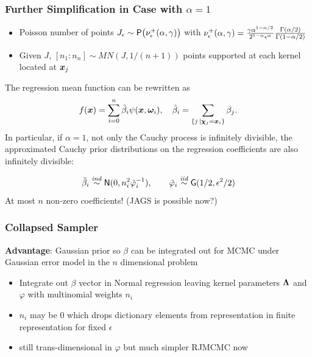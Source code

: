 \documentclass[handout]{beamer}
\newcommand{\bs}[2]{\begin{frame} \frametitle{#1}
{#2}
\end{frame} }
\begin{document}
\bs{Further Simplification in Case with $\alpha = 1$} {
  \begin{itemize}
  \item Poisson number of points $J_\epsilon\sim \mbox{\sf P}\big(
    \nu_\epsilon^+(\alpha, \gamma) \big)$ with $\nu_\epsilon^+(\alpha, \gamma)
  = \frac{\gamma \alpha^{1-\alpha/2}}{2^{1 - \alpha}\epsilon^\alpha}
  \frac{\Gamma(\alpha/2)}{\Gamma(1-\alpha/2)}$ \pause
  \item Given $J$, $[ n_1 : n_n] \sim  MN(J, 1/(n+1))$ points
    supported at each kernel located at $\bm x_j$  \pause
  \end{itemize}
The regression mean function can be rewritten as
\[
  f(\bm x) = \sum_{i=0}^n \tilde{\beta}_i \psi(\bm x, \bm \omega_i), \quad
  \tilde{\beta}_i = \sum_{\{j \, \mid \bm \chi_j = \bm x_i\}} \beta_j.
\]
\pause
In particular, if $\alpha = 1$, not only the Cauchy process is infinitely
divisible, the approximated Cauchy prior distributions on the regression
coefficients are also infinitely divisible:

$$
  \tilde{\beta}_i  \mathrel{\mathop{\sim}\limits^{\mathit{ind}}}
  \textsf{N}(0, n_i^2 \tilde{\varphi}_i^{-1}), \qquad
  \tilde{\varphi}_i \mathrel{\mathop{\sim}\limits^{\mathit{iid}}} \mbox{\sf G}( 1/2, \epsilon^2/2)
$$
\pause
At most $n$ non-zero coefficients!    (JAGS is possible now?)
}

\bs{Collapsed Sampler} {

{\bf Advantage}: Gaussian prior so $\beta$ can be integrated out for MCMC
under Gaussian error model in the $n$ dimensional problem \pause

\begin{itemize}
\item Integrate out $\beta$ vector in Normal regression leaving kernel
  parameters $\bm \Lambda$ and $\varphi$ with multinomial weights $n_i$  \pause
\item $n_i$ may be 0 which drops dictionary elements from
  representation in finite representation for fixed $\epsilon$ \pause

\item still trans-dimensional in $\varphi$ but much simpler RJMCMC now
\end{itemize}
}
\end{document}
